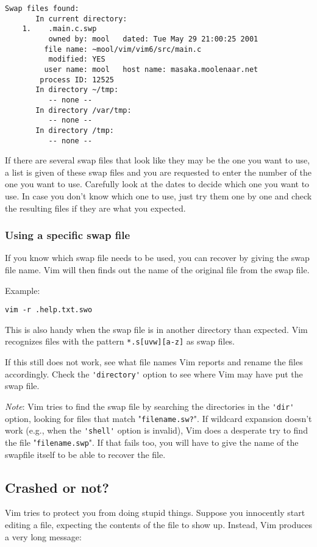 \begin{Verbatim}[samepage=true]
    Swap files found: 
       In current directory: 
    1.    .main.c.swp 
          owned by: mool   dated: Tue May 29 21:00:25 2001 
         file name: ~mool/vim/vim6/src/main.c 
          modified: YES 
         user name: mool   host name: masaka.moolenaar.net 
        process ID: 12525 
       In directory ~/tmp: 
          -- none -- 
       In directory /var/tmp: 
          -- none -- 
       In directory /tmp: 
          -- none -- 
\end{Verbatim}

If there are several swap files that look like they may be the one you want to use, a list is given of these swap files and you are requested to enter the number of the one you want to use.
Carefully look at the dates to decide which one you want to use.
In case you don't know which one to use, just try them one by one and check the resulting files if they are what you expected.

\subsubsection{Using a specific swap file}
If you know which swap file needs to be used, you can recover by giving the swap file name.
Vim will then finds out the name of the original file from the swap file.

Example:
\begin{Verbatim}[samepage=true]
 vim -r .help.txt.swo
\end{Verbatim}

This is also handy when the swap file is in another directory than expected.
Vim recognizes files with the pattern \verb!*.s[uvw][a-z]! as swap files.

If this still does not work, see what file names Vim reports and rename the files accordingly.
Check the \verb!'directory'! option to see where Vim may have put the swap file.

\emph{Note}: Vim tries to find the swap file by searching the directories in the \verb!'dir'! option, looking for files that match "\verb!filename.sw?!".
If wildcard expansion doesn't work (e.g., when the \verb!'shell'! option is invalid), Vim does a desperate try to find the file "\verb!filename.swp!".
If that fails too, you will have to give the name of the swapfile itself to be able to recover the file.
\subsection{Crashed or not?}
\label{ATTENTION}
\label{E325}
Vim tries to protect you from doing stupid things.
Suppose you innocently start editing a file, expecting the contents of the file to show up.
Instead, Vim produces a very long message:

